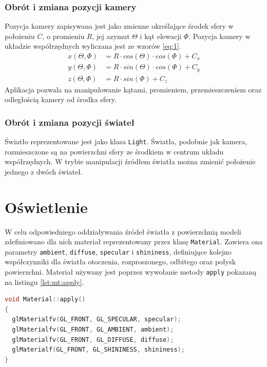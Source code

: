 \subsubsection{Obrót i zmiana pozycji kamery}
Pozycja kamery zapisywana jest jako zmienne określające środek sfery w położeniu $C$, o promieniu $R$, jej azymut $\Theta$ i kąt elewacji $\Phi$. Pozycja kamery w układzie współrzędnych wyliczana jest ze wzorów \ref{eq:1}.
\begin{subequations}
    \label{eq:1}
    \begin{align}  
        x(\Theta, \Phi) &= R \cdot cos(\Theta) \cdot cos(\Phi) + C_x\\
        y(\Theta, \Phi) &= R \cdot sin(\Theta) \cdot cos(\Phi) + C_y\\
        z(\Theta, \Phi) &= R \cdot sin(\Phi) + C_z
    \end{align}  
\end{subequations}
Aplikacja pozwala na manipulowanie kątami, promieniem, przemieszczeniem oraz odległością kamery od środka sfery.
\subsubsection{Obrót i zmiana pozycji świateł}
Światło reprezentowane jest jako klasa \lstinline{Light}. Światła, podobnie jak kamera, rozmieszczone są na powierzchni sfery ze środkiem w centrum układu współrzędnych. W trybie manipulacji źródłem światła można zmienić położenie jednego z dwóch świateł.

\section{Oświetlenie}
W celu odpowiedniego oddziaływania źródeł światła z powierzchnią modeli zdefiniowano dla nich materiał reprezentowany przez klasę \lstinline{Material}. Zawiera ona parametry \lstinline{ambient}, \lstinline{diffuse}, \lstinline{specular} i \lstinline{shininess}, definiujące kolejno współczynniki dla światła otoczenia, rozproszonego, odbitego oraz połysk powierzchni. Materiał używany jest poprzez wywołanie metody \lstinline{apply} pokazaną na listingu \ref{lst:mt:apply}.

\begin{lstlisting}[language=C++, caption=Metoda \lstinline{apply} klasy materiału., label={lst:mt:apply}]
void Material::apply()
{
  glMaterialfv(GL_FRONT, GL_SPECULAR, specular);
  glMaterialfv(GL_FRONT, GL_AMBIENT, ambient);
  glMaterialfv(GL_FRONT, GL_DIFFUSE, diffuse);
  glMaterialf(GL_FRONT, GL_SHININESS, shininess);
}
\end{lstlisting}


